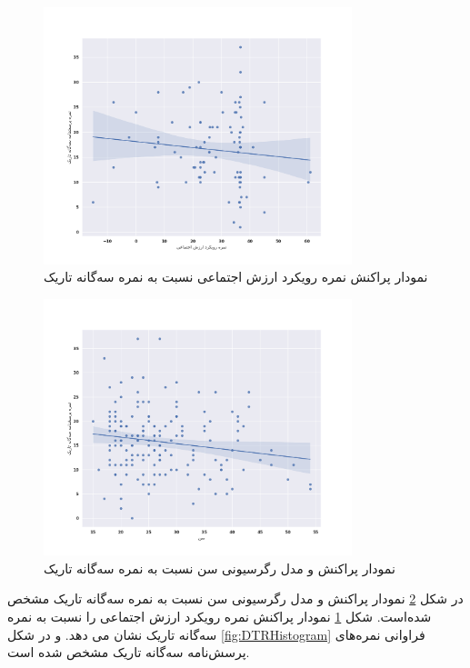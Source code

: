 \begin{figure}[htpb]
    \centering
    \includegraphics[width=0.8\textwidth]{./img/ScatterSVOScoreDarkTriadScoreSNS.png}
    \caption{نمودار پراکنش نمره رویکرد ارزش اجتماعی  نسبت به نمره سه‌گانه تاریک}
    \label{fig:ScatterSVOScoreDarkTriadScoreSNS}
\end{figure}
\begin{figure}[htpb]
    \centering
    \includegraphics[width=0.8\textwidth]{./img/ScatterDTRAgeSNS.png}
    \caption{نمودار پراکنش و مدل رگرسیونی سن نسبت به نمره سه‌گانه تاریک}
    \label{fig:ScatterDTRAgeSNS}
\end{figure}
در شکل
\ref{fig:ScatterDTRAgeSNS}
نمودار پراکنش و مدل رگرسیونی سن نسبت به نمره سه‌گانه تاریک مشخص شده‌است.
شکل
\ref{fig:ScatterSVOScoreDarkTriadScoreSNS}
نمودار پراکنش نمره رویکرد ارزش اجتماعی را نسبت به نمره سه‌گانه تاریک نشان می دهد.
و در شکل
\ref{fig:DTRHistogram}
فراوانی نمره‌های پرسش‌نامه سه‌گانه تاریک مشخص شده است.

